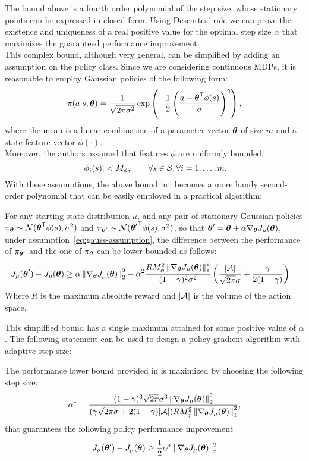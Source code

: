 The bound above is a fourth order polynomial of the step size, whose stationary points can be expressed in closed form. Using Descartes' rule we can prove the existence and uniqueness of a real positive value for the optimal step size $\alpha$ that maximizes the guaranteed performance improvement. \\
This complex bound, although very general, can be simplified by adding an assumption on the policy class. Since we are considering continuous MDPs, it is reasonable to employ Gaussian policies of the following form:
\[
\pi(a|s,\vtheta)=\frac{1}{\sqrt{2\pi\sigma^2}}\exp\left( -\frac{1}{2}\left( \frac{a-\transpose{\vtheta}\phi(s)}{\sigma} \right)^2 \right),
\]
where the mean is a linear combination of a parameter vector $\vtheta$ of size $m$ and a state feature vector $\phi(\cdot)$.\\
Moreover, the authors assumed that features $\phi$ are uniformly bounded:
\begin{equation}
\label{eq:gauss-assumption}
|\phi_i(s)|<M_\phi,\qquad\forall s \in \sspace, \forall i = 1,\ldots,m.
\end{equation}
With these assumptions, the above bound in~ becomes a more handy second-order polynomial that can be easily employed in a practical algorithm:
\begin{theorem}
\label{th:adaptive-gauss-bound}
For any starting state distribution $\mu$, and any pair of stationary Gaussian policies $\pi_{\vtheta}\sim\mathcal{N}(\transpose{\vtheta}\phi(s), \sigma^2)$ and $\pi_{\vtheta '}\sim\mathcal{N}(\transpose{\vtheta'}\phi(s), \sigma^2)$, so that $\vtheta' = \vtheta + \alpha\gradj$, under assumption~\ref{eq:gauss-assumption}, the difference between the performance of $\pi_{\vtheta'}$ and the one of $\pi_{\vtheta}$ can be lower bounded as follows:
\begin{align*}
J_\mu(\vtheta') - J_\mu(\vtheta) &\geq \alpha\norm[2]{\gradj}^2- \alpha^2\frac{RM_\phi^2\norm[1]{\gradj}^2}{(1-\gamma)^2\sigma^2}\left(\frac{|\aspace|}{\sqrt{2\pi}\sigma}+\frac{\gamma}{2(1-\gamma)}\right)
\end{align*}
Where $R$ is the maximum absolute reward and $|\aspace|$ is the volume of the action space. 
\end{theorem}

This simplified bound has a single maximum attained for some positive value of $\alpha$. The following statement can be used to design a policy gradient algorithm with adaptive step size:
\begin{corollary}
\label{th:simplified-gauss-bound}
The performance lower bound provided in  is maximized by choosing the following step size:
\footnotesize
\[
\alpha^* = \frac{(1-\gamma)^3\sqrt{2\pi}\sigma^3\norm[2]{\gradj}^2}{(\gamma\sqrt{2\pi}\sigma +2(1-\gamma)|\aspace|)RM_\phi^2\norm[1]{\gradj}^2},
\]
\normalsize
that guarantees the following policy performance improvement
\[
J_\mu(\vtheta') - J_\mu(\vtheta) \geq \frac{1}{2}\alpha^* \norm[2]{\gradj}^2
\]
\end{corollary}



